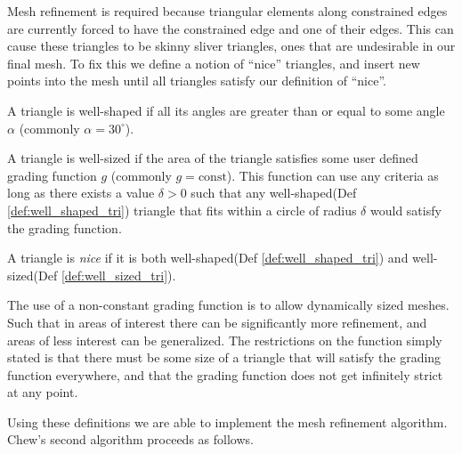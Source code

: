 \documentclass[../fem.tex]{subfiles}
\begin{document}
Mesh refinement is required because triangular elements along constrained
edges are currently forced to have the constrained edge and one of their edges.
This can cause these triangles to be skinny sliver triangles, ones that are
undesirable in our final mesh. To fix this we define a notion of ``nice''
triangles, and insert new points into the mesh until all triangles satisfy
our definition of ``nice''.

\begin{definition}\label{def:well_shaped_tri}
  A triangle is well-shaped if all its angles are greater than or equal to some
  angle $\alpha$ (commonly $\alpha=30^{\circ}$).
\end{definition}

\begin{definition}\label{def:well_sized_tri}
  A triangle is well-sized if the area of the triangle satisfies some user
  defined grading function $g$ (commonly $g=\text{const}$). This function can
  use any criteria as long as there exists a value $\delta > 0$ such that any
  well-shaped(Def \ref{def:well_shaped_tri}) triangle that fits within a circle
  of radius $\delta$ would satisfy the grading function.
\end{definition}

\begin{definition} \label{def:nice_tri}
  A triangle is \textit{nice} if it is both well-shaped(Def
  \ref{def:well_shaped_tri}) and well-sized(Def \ref{def:well_sized_tri}).
\end{definition}

The use of a non-constant grading function is to allow dynamically sized
meshes.  Such that in areas of interest there can be significantly more
refinement, and areas of less interest can be generalized. The restrictions on
the function simply stated is that there must be some size of a triangle that
will satisfy the grading function everywhere, and that the grading function
does not get infinitely strict at any point.

Using these definitions we are able to implement the mesh refinement algorithm.
Chew's second algorithm proceeds as follows.
\end{document}
